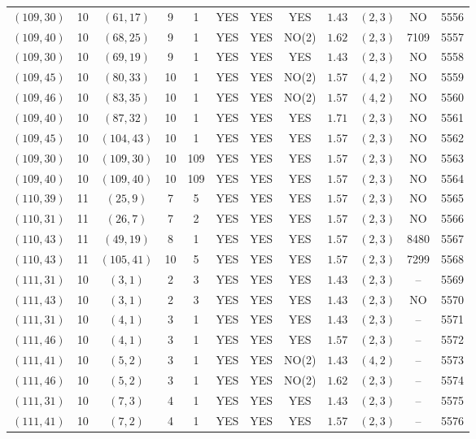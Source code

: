 \begin{longtable}{|c|c|c|c|c|c|c|c|c|c|c|c|}
$(109,30)$ & 10 & $(61,17)$ & 9 & 1 & YES & YES & YES & $1.43$ & $(2,3)$ & NO & 5556\\
$(109,40)$ & 10 & $(68,25)$ & 9 & 1 & YES & YES & NO(2) & $1.62$ & $(2,3)$ & 7109 & 5557\\
$(109,30)$ & 10 & $(69,19)$ & 9 & 1 & YES & YES & YES & $1.43$ & $(2,3)$ & NO & 5558\\
$(109,45)$ & 10 & $(80,33)$ & 10 & 1 & YES & YES & NO(2) & $1.57$ & $(4,2)$ & NO & 5559\\
$(109,46)$ & 10 & $(83,35)$ & 10 & 1 & YES & YES & NO(2) & $1.57$ & $(4,2)$ & NO & 5560\\
$(109,40)$ & 10 & $(87,32)$ & 10 & 1 & YES & YES & YES & $1.71$ & $(2,3)$ & NO & 5561\\
$(109,45)$ & 10 & $(104,43)$ & 10 & 1 & YES & YES & YES & $1.57$ & $(2,3)$ & NO & 5562\\
$(109,30)$ & 10 & $(109,30)$ & 10 & 109 & YES & YES & YES & $1.57$ & $(2,3)$ & NO & 5563\\
$(109,40)$ & 10 & $(109,40)$ & 10 & 109 & YES & YES & YES & $1.57$ & $(2,3)$ & NO & 5564\\
$(110,39)$ & 11 & $(25,9)$ & 7 & 5 & YES & YES & YES & $1.57$ & $(2,3)$ & NO & 5565\\
$(110,31)$ & 11 & $(26,7)$ & 7 & 2 & YES & YES & YES & $1.57$ & $(2,3)$ & NO & 5566\\
$(110,43)$ & 11 & $(49,19)$ & 8 & 1 & YES & YES & YES & $1.57$ & $(2,3)$ & 8480 & 5567\\
$(110,43)$ & 11 & $(105,41)$ & 10 & 5 & YES & YES & YES & $1.57$ & $(2,3)$ & 7299 & 5568\\
$(111,31)$ & 10 & $(3,1)$ & 2 & 3 & YES & YES & YES & $1.43$ & $(2,3)$ & -- & 5569\\
$(111,43)$ & 10 & $(3,1)$ & 2 & 3 & YES & YES & YES & $1.43$ & $(2,3)$ & NO & 5570\\
$(111,31)$ & 10 & $(4,1)$ & 3 & 1 & YES & YES & YES & $1.43$ & $(2,3)$ & -- & 5571\\
$(111,46)$ & 10 & $(4,1)$ & 3 & 1 & YES & YES & YES & $1.57$ & $(2,3)$ & -- & 5572\\
$(111,41)$ & 10 & $(5,2)$ & 3 & 1 & YES & YES & NO(2) & $1.43$ & $(4,2)$ & -- & 5573\\
$(111,46)$ & 10 & $(5,2)$ & 3 & 1 & YES & YES & NO(2) & $1.62$ & $(2,3)$ & -- & 5574\\
$(111,31)$ & 10 & $(7,3)$ & 4 & 1 & YES & YES & YES & $1.43$ & $(2,3)$ & -- & 5575\\
$(111,41)$ & 10 & $(7,2)$ & 4 & 1 & YES & YES & YES & $1.57$ & $(2,3)$ & -- & 5576\\

\end{longtable}

